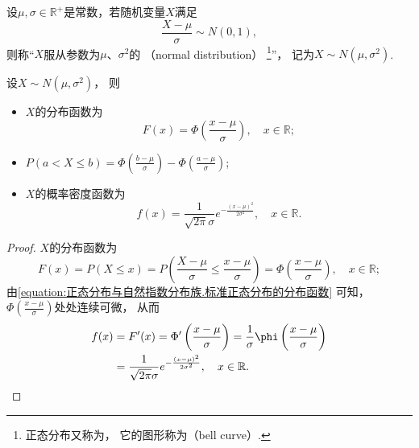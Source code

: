 \begin{definition}\label{definition:正态分布.正态分布的定义}
设\(\mu,\sigma\in\mathbb{R}^+\)是常数，若随机变量\(X\)满足\[
	\frac{X-\mu}{\sigma} \sim N(0,1),
\]
则称“\(X\)服从参数为\(\mu\)、\(\sigma^2\)的%
（normal distribution）%
\footnote{正态分布又称为，
它的图形称为（bell curve）.}”，
记为\(X \sim N(\mu,\sigma^2)\).
\end{definition}

\begin{theorem}
设\(X \sim N(\mu,\sigma^2)\)，
则\begin{itemize}
	\item \(X\)的分布函数为\[
		F(x) = \Phi\left(\frac{x-\mu}{\sigma}\right),
		\quad x\in\mathbb{R};
	\]
	\item \(P(a < X \leq b) = \Phi\left(\frac{b-\mu}{\sigma}\right) - \Phi\left(\frac{a-\mu}{\sigma}\right)\);
	\item \(X\)的概率密度函数为\begin{equation}\label{equation:连续型分布.正态分布的密度函数}
		f(x) = \frac{1}{\sqrt{2 \pi} \sigma} e^{-\frac{(x-\mu)^2}{2\sigma^2}},
		\quad x\in\mathbb{R}.
	\end{equation}
\end{itemize}
\begin{proof}
\(X\)的分布函数为\[
	F(x) = P(X \leq x)
	= P\left(\frac{X-\mu}{\sigma}\leq\frac{x-\mu}{\sigma}\right)
	= \Phi\left(\frac{x-\mu}{\sigma}\right), \quad x\in\mathbb{R};
\]
由\cref{equation:正态分布与自然指数分布族.标准正态分布的分布函数} 可知，
\(\Phi\left(\frac{x-\mu}{\sigma}\right)\)处处连续可微，
从而\begin{align*}
	f(x) &= F'(x) = \Phi'\left(\frac{x-\mu}{\sigma}\right)
	= \frac{1}{\sigma} \phi\left(\frac{x-\mu}{\sigma}\right) \\
	&= \frac{1}{\sqrt{2 \pi} \sigma} e^{-\frac{(x-\mu)^2}{2\sigma^2}},
	\quad x\in\mathbb{R}.
	\qedhere
\end{align*}
\end{proof}
\end{theorem}

